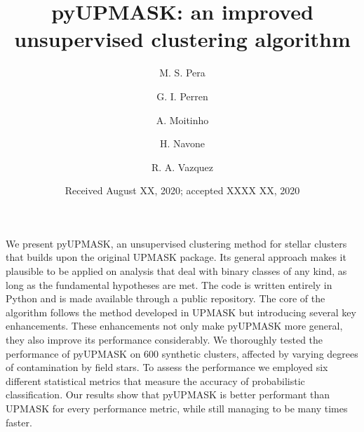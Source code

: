 \documentclass{aa}
\begin{document}
 


\title{pyUPMASK: an improved unsupervised clustering algorithm}

\author{M. S. Pera
\and
G. I. Perren
\and
A. Moitinho
\and
H. Navone
\and
R. A. Vazquez
}


\date{Received August XX, 2020; accepted XXXX XX, 2020}

\abstract
  {}
  {We present pyUPMASK, an unsupervised clustering method for stellar clusters
  that builds upon the original UPMASK package. Its general approach makes it
  plausible to be applied on analysis that deal with binary classes of any kind,
  as long as the fundamental hypotheses are met.
  The code is written entirely in Python and is made available through a public
  repository.}
  {The core of the algorithm follows the method developed in UPMASK but
  introducing several key enhancements. These enhancements not only make
  pyUPMASK more general, they also improve its performance considerably.
  }
  {We thoroughly tested the performance of pyUPMASK on 600 synthetic clusters,
  affected by varying degrees of contamination by field stars. To assess the
  performance we employed six different statistical metrics that measure the
  accuracy of probabilistic classification.}
  {Our results show that pyUPMASK is better performant than UPMASK for every
  performance  metric, while still managing to be many times faster.
  }
\end{document}
